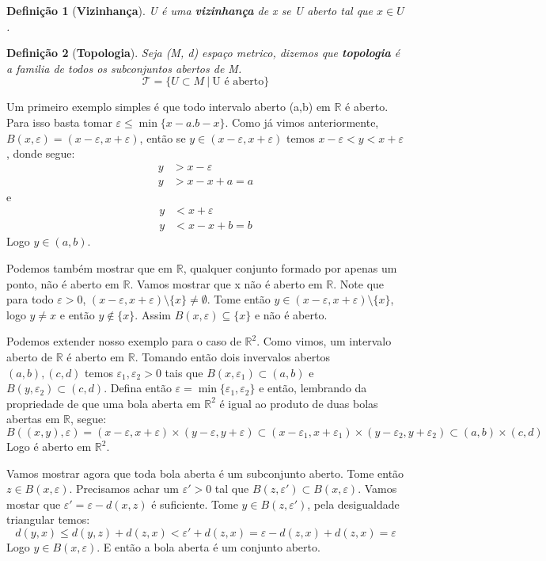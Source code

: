 \documentclass{article}
\newtheorem*{definition}{Definição}
\begin{document}
\begin{definition}[\textbf{Vizinhança}]
    U é uma \textbf{vizinhança} de x se U aberto tal que $x \in U$.
\end{definition}

\begin{definition}[\textbf{Topologia}]
    Seja (M, d) espaço metrico, dizemos que \textbf{topologia} é a familia de todos os subconjuntos abertos de M.
    \[ \mathcal{T} = \{ U \subset M \: | \: \text{U é aberto}\} \]
\end{definition}

Um primeiro exemplo simples é que todo intervalo aberto (a,b) em $\mathbb{R}$ é aberto.
Para isso basta tomar $\varepsilon \leq \min\{x-a. b-x\}$. Como já vimos anteriormente, 
$B(x, \varepsilon) = (x - \varepsilon, x + \varepsilon)$, então se $y \in (x - \varepsilon, x + \varepsilon)$
temos $ x - \varepsilon < y < x + \varepsilon $, donde segue:
\begin{align*}
    y &> x - \varepsilon \\
    y &> x - x + a = a
\end{align*}
e
\begin{align*}
    y &< x + \varepsilon \\
    y &< x - x + b = b
\end{align*}
Logo $y \in (a, b)$.

Podemos também mostrar que em $\mathbb{R}$, qualquer conjunto formado por apenas um ponto, 
não é aberto em $\mathbb{R}$. Vamos mostrar que {x} não é aberto em $\mathbb{R}$. Note que
para todo $\varepsilon > 0$, $(x - \varepsilon, x + \varepsilon) \setminus \{x\} \neq \emptyset$.
Tome então $y \in (x - \varepsilon, x + \varepsilon) \setminus \{x\}$, logo $y \neq x$ e então 
$y \notin \{x\}$. Assim $B(x, \varepsilon) \subseteq \{x\}$ e não é aberto.

Podemos extender nosso exemplo para o caso de $\mathbb{R}^2$. Como vimos, um intervalo aberto de $\mathbb{R}$
é aberto em $\mathbb{R}$. Tomando então dois invervalos abertos $(a, b), (c, d)$ temos 
$\varepsilon_1, \varepsilon_2 > 0$ tais que $B(x, \varepsilon_1) \subset (a, b)$ e $B(y, \varepsilon_2) \subset (c, d)$.
Defina então $\varepsilon = \min\{\varepsilon_1, \varepsilon_2\}$ e então, lembrando da propriedade de que uma bola aberta em $\mathbb{R}^2$ é igual ao produto de duas bolas abertas em $\mathbb{R}$, segue:
\[B((x, y), \varepsilon) = (x-\varepsilon, x+\varepsilon) \times (y-\varepsilon, y+\varepsilon) \subset (x-\varepsilon_1, x+\varepsilon_1) \times (y-\varepsilon_2, y+\varepsilon_2) \subset (a, b) \times (c, d)\]
Logo é aberto em $\mathbb{R}^2$.

Vamos mostrar agora que toda bola aberta é um subconjunto aberto.
Tome então $z \in B(x, \varepsilon)$. Precisamos achar um $\varepsilon' >0$ tal que $B(z, \varepsilon') \subset B(x, \varepsilon)$.
Vamos mostar que $\varepsilon' = \varepsilon - d(x, z)$ é suficiente.
Tome $y \in B(z, \varepsilon')$, pela desigualdade triangular temos:
\[d(y, x) \leq d(y, z) + d(z, x) < \varepsilon' + d(z, x) = \varepsilon - d(z, x) + d(z, x) = \varepsilon\]
Logo $y \in B(x, \varepsilon)$. E então a bola aberta é um conjunto aberto.
\end{document}
